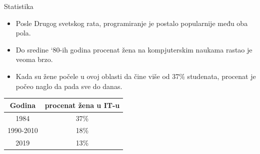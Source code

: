 \documentclass[aspectratio=169]{beamer}
\begin{document}
\begin{frame}{Statistika}

    \begin{itemize}
        \item<1-> Posle Drugog svetskog rata, programiranje je postalo popularnije među oba pola.
        
        \item<2->Do sredine ‘80-ih godina procenat žena na kompjuterskim naukama rastao je veoma brzo.
        
        \item<3-> Kada su žene počele u ovoj oblasti da čine više od \alert{37\%} studenata, procenat je počeo naglo da pada sve do danas. 
    \end{itemize}

    \begin{table}[h]
        \centering
        \begin{tabular}{c|c}
        \toprule
                Godina    & procenat žena u IT-u \\ 
        \midrule
                1984       & 37\%  \\ 
                1990-2010  & 18\%  \\ 
                2019       & 13\%  \\ 
        \bottomrule
        \end{tabular}
    \end{table}

\end{frame}

\end{document}

